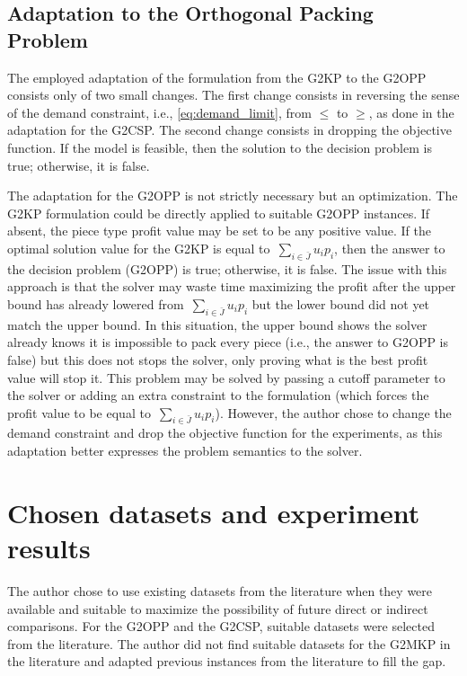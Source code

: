 \subsection{Adaptation to the Orthogonal Packing Problem}

The employed adaptation of the formulation from the G2KP to the G2OPP consists only of two small changes.
The first change consists in reversing the sense of the demand constraint, i.e., \cref{eq:demand_limit}, from \(\leq\) to \(\geq\), as done in the adaptation for the G2CSP. %
The second change consists in dropping the objective function.
If the model is feasible, then the solution to the decision problem is true; otherwise, it is false.

The adaptation for the G2OPP is not strictly necessary but an optimization.
The G2KP formulation could be directly applied to suitable G2OPP instances.
If absent, the piece type profit value may be set to be any positive value.
If the optimal solution value for the G2KP is equal to~\(\sum_{i\in\bar{J}} u_i p_i\), then the answer to the decision problem (G2OPP) is true; otherwise, it is false.
The issue with this approach is that the solver may waste time maximizing the profit after the upper bound has already lowered from~\(\sum_{i\in\bar{J}} u_i p_i\) but the lower bound did not yet match the upper bound.
In this situation, the upper bound shows the solver already knows it is impossible to pack every piece (i.e., the answer to G2OPP is false) but this does not stops the solver, only proving what is the best profit value will stop it.
This problem may be solved by passing a cutoff parameter to the solver or adding an extra constraint to the formulation (which forces the profit value to be equal to~\(\sum_{i\in\bar{J}} u_i p_i\)).
However, the author chose to change the demand constraint and drop the objective function for the experiments, as this adaptation better expresses the problem semantics to the solver.

\section{Chosen datasets and experiment results}

The author chose to use existing datasets from the literature when they were available and suitable to maximize the possibility of future direct or indirect comparisons.
For the G2OPP and the G2CSP, suitable datasets were selected from the literature.
The author did not find suitable datasets for the G2MKP in the literature and adapted previous instances from the literature to fill the gap.

